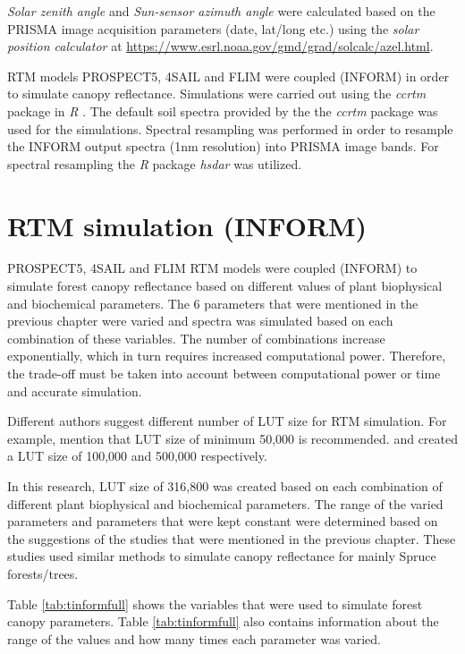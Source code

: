 \documentclass[a4paper, nobind]{templates/ociamthesis}
\begin{document}
\emph{Solar zenith angle} and \emph{Sun-sensor azimuth angle} were calculated based on the PRISMA image acquisition parameters (date, lat/long etc.) using the \emph{solar position calculator} at \url{https://www.esrl.noaa.gov/gmd/grad/solcalc/azel.html}.

RTM models PROSPECT5, 4SAIL and FLIM were coupled (INFORM) in order to simulate canopy reflectance. Simulations were carried out using the \emph{ccrtm} package \citep{ccrtm} in \emph{R} \citep{r}. The default soil spectra provided by the the \emph{ccrtm} package \citep{ccrtm} was used for the simulations. Spectral resampling was performed in order to resample the INFORM output spectra (1nm resolution) into PRISMA image bands. For spectral resampling the \emph{R} package \emph{hsdar} \citep{hsdar} was utilized.

\hypertarget{rtm-simulation-inform}{%
\section{RTM simulation (INFORM)}\label{rtm-simulation-inform}}

PROSPECT5, 4SAIL and FLIM RTM models were coupled (INFORM) to simulate forest canopy reflectance based on different values of plant biophysical and biochemical parameters. The 6 parameters that were mentioned in the previous chapter were varied and spectra was simulated based on each combination of these variables. The number of combinations increase exponentially, which in turn requires increased computational power. Therefore, the trade-off must be taken into account between computational power or time and accurate simulation.

Different authors suggest different number of LUT size for RTM simulation. For example, \citet{danner2021efficient} mention that LUT size of minimum 50,000 is recommended. \citet{ali2020machine} and \citet{darvishzadeh2019mapping} created a LUT size of 100,000 and 500,000 respectively.

In this research, LUT size of 316,800 was created based on each combination of different plant biophysical and biochemical parameters. The range of the varied parameters and parameters that were kept constant were determined based on the suggestions of the studies that were mentioned in the previous chapter. These studies used similar methods to simulate canopy reflectance for mainly Spruce forests/trees.

Table \ref{tab:tinformfull} shows the variables that were used to simulate forest canopy parameters. Table \ref{tab:tinformfull} also contains information about the range of the values and how many times each parameter was varied.
\end{document}

